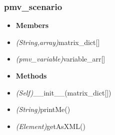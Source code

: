 \documentclass{report}
\begin{document}
\subsubsection{pmv\_scenario}
\begin{itemize}[label=]
\item \textbf{Members}
\end{itemize}
\begin{itemize}[label=\_\_]
\item\textit{(String,array)}matrix\_dict[]
\item\textit{(pmv\_variable)}variable\_arr[]

\end{itemize}
\begin{itemize}[label=]
\item \textbf{Methods}
\end{itemize}
\begin{itemize}[label=+]
\item\textit{(Self)}\_\_init\_\_(matrix\_dict[])
\item\textit{(String)}printMe()
\item\textit{(Element)}getAsXML()
\end{itemize}
\end{document}
